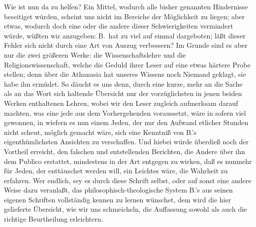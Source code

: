 Wie ist nun da zu helfen? Ein Mittel, wodurch alle bisher genannten Hindernisse beseitiget würden, scheint uns nicht im Bereiche der Möglichkeit zu liegen; aber etwas, wodurch doch eine oder die andere dieser Schwierigkeiten vermindert würde, wüßten wir anzugeben: B.\ hat zu viel auf einmal dargeboten; läßt dieser Fehler sich nicht durch eine Art von Auszug verbessern? Im Grunde sind es aber nur die zwei größeren Werke: die Wissenschaftslehre und die Religionswissenschaft, welche die Geduld ihrer Leser auf eine etwas härtere Probe stellen; denn über die Athanasia hat unseres Wissens noch Niemand geklagt, sie habe ihn ermüdet. So däucht es uns denn, durch eine kurze, mehr an die Sache als an das Wort sich haltende Übersicht nur der vorzüglichsten in jenen beiden Werken enthaltenen Lehren, wobei wir den Leser zugleich aufmerksam darauf machten, was eine jede aus dem Vorhergehenden voraussetzt, wäre in sofern viel gewonnen, in wiefern es nun einem Jeden, der nur den Aufwand etlicher Stunden nicht scheut, möglich gemacht wäre, sich eine Kenntniß von B.'s eigenthümlichsten Ansichten zu verschaffen. Und hiebei würde überdieß noch der Vortheil erreicht, den falschen und entstellenden Berichten, die Andere über ihn dem Publico erstattet, mindestens in der Art entgegen zu wirken, daß es nunmehr für Jeden, der enttäuschet  werden will, ein Leichtes wäre, die Wahrheit zu erfahren. Wer endlich, sey es durch diese Schrift selbst, oder auf sonst eine andere Weise dazu veranlaßt, das philosophisch-theologische System B.'s aus seinen eigenen Schriften vollständig kennen zu lernen wünschet, dem wird die hier gelieferte Übersicht, wie wir uns schmeicheln, die Auffassung sowohl als auch die richtige Beurtheilung erleichtern. \par
\endinput